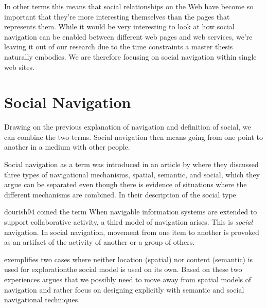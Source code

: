 In other terms this means that social relationships on the Web have become so
important that they're more interesting themselves than the pages that
represents them. While it would be very interesting to look at how social
navigation can be enabled between different web pages and web services,%
we're leaving it out of our research due to the time constraints a master
thesis naturally embodies. We are therefore focusing on social navigation
within single web sites.

\section{Social Navigation}
\label{section:social.navigation.social.navigation}

Drawing on the previous explanation of navigation and definition of social, we
can combine the two terms. Social navigation then means going from one point
to another in a medium with other people.

Social navigation as a term was introduced in an article by
\citet{dourish94} where they discussed three types of navigational mechanisms,
spatial, semantic,%
and social, which they argue can be separated even though
there is evidence of situations where the different mechanisms are combined.
In their description of the social type
\begin{fullquote}[\p{1}]{dourish94}{%
  coined the term }
    When navigable information systems are extended to support collaborative
    activity, a third model of navigation arises. This is \emph{social}
    navigation. In social navigation, movement from one item to another is
    provoked as an artifact of the activity of another or a group of others.
\end{fullquote}

\citeauthor{dourish94} exemplifies two cases where neither location
(spatial) nor content (semantic) is used for exploration\dash{}the social
model is used on its own. Based on these two experiences
\citeauthor{dourish94} argues that we possibly need to move away from spatial
models of navigation and rather focus on designing explicitly with semantic
and social navigational techniques.

